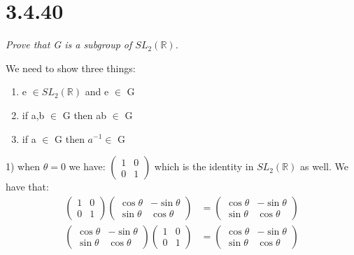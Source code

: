 \documentclass[a4paper, 11pt]{article}
\begin{document}
\section*{3.4.40}
\textit{Prove that G is a subgroup of $SL_2(\mathbb{R})$.}

We need to show three things: 

\begin{enumerate}
	\item e $\in SL_2(\mathbb{R})$ and e $\in$ G 
	\item if a,b $\in$ G then ab $\in$ G 
	\item if a $\in$ G then $a^{-1} \in$ G
\end{enumerate}

1) when $\theta = 0$ we have: 
$
\begin{pmatrix}
	1 & 0 \\ 
	0 & 1 
\end{pmatrix}
$
which is the identity in $SL_2(\mathbb{R})$ as well. We have that: 
\begin{align*}
	\begin{pmatrix}
		1 & 0 \\
		0 & 1
	\end{pmatrix}
	\begin{pmatrix}
		\cos{\theta} & -\sin{\theta} \\
		\sin{\theta} & \cos{\theta}
	\end{pmatrix}
	&= 
	\begin{pmatrix}
		\cos{\theta} & -\sin{\theta} \\
		\sin{\theta} & \cos{\theta} 
	\end{pmatrix} \\
	\begin{pmatrix}
		\cos{\theta} & -\sin{\theta} \\
		\sin{\theta} & \cos{\theta}
	\end{pmatrix}
	\begin{pmatrix}
		1 & 0 \\
		0 & 1
	\end{pmatrix}
	&= 
	\begin{pmatrix}
		\cos{\theta} & -\sin{\theta} \\
		\sin{\theta} & \cos{\theta}
	\end{pmatrix}
\end{align*}
\end{document}
